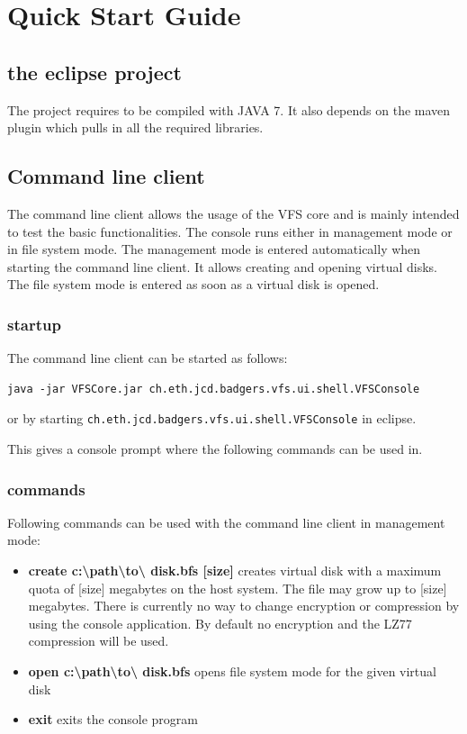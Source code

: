 

\section{Quick Start Guide}


\subsection{the eclipse project}
The project requires to be compiled with JAVA 7. It also depends on the maven
plugin which pulls in all the required libraries.

\subsection{Command line client}

The command line client allows the usage of the VFS core and is mainly intended
to test the basic functionalities. The console runs either in  management mode
or in file system mode. The management mode is entered automatically when
starting the command line client. It allows creating and opening virtual
disks. The file system mode is entered as soon as a virtual disk is opened.

\subsubsection{startup}
The command line client can be started as follows:

\begin{verbatim}
java -jar VFSCore.jar ch.eth.jcd.badgers.vfs.ui.shell.VFSConsole
\end{verbatim}

or by starting \verb|ch.eth.jcd.badgers.vfs.ui.shell.VFSConsole| in eclipse.



This gives a console prompt where the following commands can be used in.

\subsubsection{commands}
Following commands can be used with the command line client in management mode:

\begin{itemize}
  \item{\textbf{create c:\textbackslash path\textbackslash to\textbackslash
  disk.bfs [size]}} creates virtual disk with a maximum quota of [size]
  megabytes on the host system. The file may grow up to [size] megabytes. There
  is currently no way to change encryption or compression by using the console
  application. By default no encryption and the LZ77 compression will be used.
  \item {\textbf{open c:\textbackslash path\textbackslash to\textbackslash
  disk.bfs}} opens file system mode for the given virtual disk
  \item {\textbf{exit}} exits the console program
\end{itemize}

